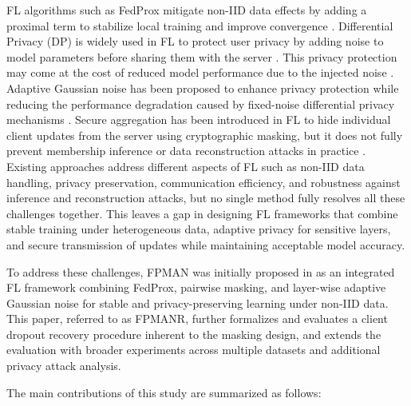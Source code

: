 \documentclass[a4paper,fleqn]{cas-dc}
\begin{document}
FL algorithms such as FedProx mitigate non-IID data effects by adding a proximal term to stabilize local training and improve convergence \citep{cao2025comparative}. Differential Privacy (DP) is widely used in FL to protect user privacy by adding noise to model parameters before sharing them with the server \citep{nilsson2018performance}. This privacy protection may come at the cost of reduced model performance due to the injected noise \citep{zhang2021survey}. Adaptive Gaussian noise has been proposed to enhance privacy protection while reducing the performance degradation caused by fixed-noise differential privacy mechanisms \citep{jiao2023differential}. Secure aggregation has been introduced in FL to hide individual client updates from the server using cryptographic masking, but it does not fully prevent membership inference or data reconstruction attacks in practice \citep{bonawitz2017practical}. Existing approaches address different aspects of FL such as non-IID data handling, privacy preservation, communication efficiency, and robustness against inference and reconstruction attacks, but no single method fully resolves all these challenges together. This leaves a gap in designing FL frameworks that combine stable training under heterogeneous data, adaptive privacy for sensitive layers, and secure transmission of updates while maintaining acceptable model accuracy.

To address these challenges, FPMAN was initially proposed in \citet{esha2026fpman} as an integrated FL framework combining FedProx, pairwise masking, and layer-wise adaptive Gaussian noise for stable and privacy-preserving learning under non-IID data. This paper, referred to as FPMANR, further formalizes and evaluates a client dropout recovery procedure inherent to the masking design, and extends the evaluation with broader experiments across multiple datasets and additional privacy attack analysis.

The main contributions of this study are summarized as follows:
\end{document}
